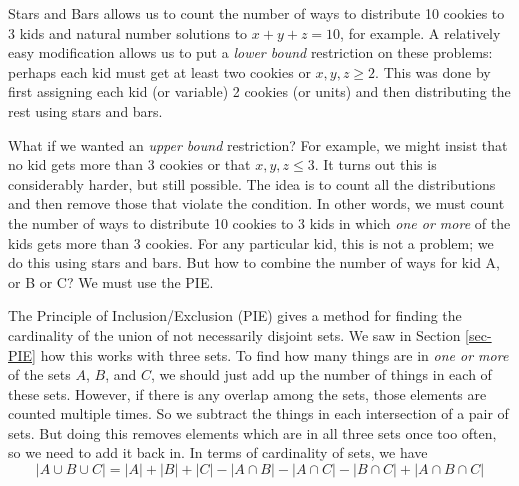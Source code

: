 \documentclass[12pt]{article}
\begin{document}
Stars and Bars allows us to count the number of ways to distribute 10 cookies to 3 kids and natural number solutions to $x+y+z = 10$, for example.  A relatively easy modification allows us to put a \emph{lower bound} restriction on these problems: perhaps each kid must get at least two cookies or $x,y,z \ge 2$.  This was done by first assigning each kid (or variable) 2 cookies (or units) and then distributing the rest using stars and bars.

What if we wanted an \emph{upper bound} restriction?  For example, we might insist that no kid gets more than 3 cookies or that $x, y, z \le 3$.  It turns out this is considerably harder, but still possible.  The idea is to count all the distributions and then remove those that violate the condition.  In other words, we must count the number of ways to distribute 10 cookies to 3 kids in which \emph{one or more} of the kids gets more than 3 cookies.  For any particular kid, this is not a problem; we do this using stars and bars.  But how to combine the number of ways for kid A, or B or C?  We must use the PIE.  


The Principle of Inclusion/Exclusion (PIE) gives a method for finding the cardinality of the union of not necessarily disjoint sets.  We saw in Section \ref{sec-PIE} how this works with three sets.  To find how many things are in {\em one or more} of the sets $A$, $B$, and $C$, we should just add up the number of things in each of these sets.  However, if there is any overlap among the sets, those elements are counted multiple times.  So we subtract the things in each intersection of a pair of sets.  But doing this removes elements which are in all three sets once too often, so we need to add it back in.  In terms of cardinality of sets, we have
\[|A \cup B \cup C| = |A| + |B| + |C| - |A \cap B| - |A \cap C| - |B \cap C| + |A\cap B \cap C|\]
\end{document}
